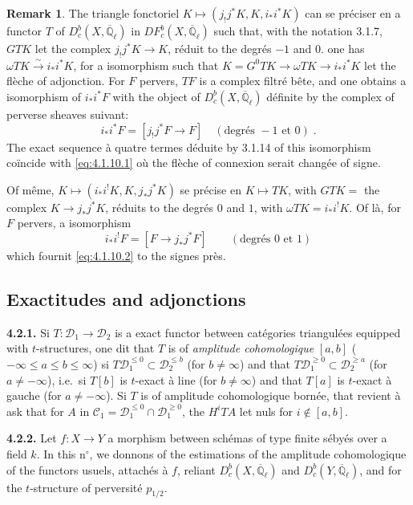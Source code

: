 \documentclass[12pt,a4paper]{article}
\theoremstyle{plain}
\theoremstyle{definition}
\newtheorem{remark}[theorem]{Remark}
\newcommand{\cC}{\mathcal{C}}
\newcommand{\cD}{\mathcal{D}}
\newcommand{\isom}{\xrightarrow{\sim}}
\providecommand{\cC}{\mathcal{C}}
\providecommand{\cD}{\mathcal{D}}
\begin{document}
\begin{remark}\label{rem:4.1.13}
The triangle fonctoriel $K \longmapsto (j_{!}j^{*}K, K, i_{*}i^{*}K)$ can se pr\'{e}ciser en a functor $T$ of $D_{c}^{b}(X,\overline{\mathbb{Q}}_{\ell})$ in $DF_{c}^{b}(X,\overline{\mathbb{Q}}_{\ell})$ such that, with the notation 3.1.7, $GTK$ let the complex $j_{!}j^{*}K \longrightarrow K$, r\'{e}duit to the degr\'{e}s $-1$ and $0$. one has $\omega TK \isom i_{*}i^{*}K$, for a isomorphism such that $K = G^{0}TK \to \omega TK \longrightarrow i_{*}i^{*}K$ let the fl\`{e}che of adjonction. For $F$ pervers, $TF$ is a complex filtr\'{e} b\^{e}te, and one obtains a isomorphism of $i_{*}i^{*}F$ with the object of $D_{c}^{b}(X,\overline{\mathbb{Q}}_{\ell})$ d\'{e}finite by the complex of perverse sheaves suivant:
\[
i_{*}i^{*}F = [j_{!}j^{*}F \longrightarrow F] \quad (\text{degr\'{e}s } -1 \text{ et } 0)\;.
\]
The exact sequence \`{a} quatre termes d\'{e}duite by 3.1.14 of this isomorphism co\"{i}ncide with \eqref{eq:4.1.10.1} o\`{u} the fl\`{e}che of connexion serait chang\'{e}e of signe.

Of m\^{e}me, $K \longmapsto (i_{*}i^{!}K, K, j_{*}j^{*}K)$ se pr\'{e}cise en $K \longmapsto TK$, with $GTK =$ the complex $K \to j_{*}j^{*}K$, r\'{e}duits to the degr\'{e}s $0$ and $1$, with $\omega TK = i_{*}i^{!}K$. Of l\`{a}, for $F$ pervers, a isomorphism
\[
i_{*}i^{!}F = [F \to j_{*}j^{*}F] \qquad (\text{degr\'{e}s } 0 \text{ et } 1)
\]
which fournit \eqref{eq:4.1.10.2} to the signes pr\`{e}s.
\end{remark}

\subsection{Exactitudes and adjonctions}

\noindent\textbf{4.2.1.} Si $T: \cD_{1} \to \cD_{2}$ is a exact functor between cat\'{e}gories triangul\'{e}es equipped with $t$-structures, one dit that $T$ is of \emph{amplitude cohomologique} $[a,b]$ ($-\infty \leq a \leq b \leq \infty$) si $T\cD_{1}^{\leq 0} \subset \cD_{2}^{\leq b}$ (for $b \neq \infty$) and that $T\cD_{1}^{\geq 0} \subset \cD_{2}^{\geq a}$ (for $a \neq -\infty$), i.e.\ si $T[b]$ is $t$-exact \`{a} line (for $b \neq \infty$) and that $T[a]$ is $t$-exact \`{a} gauche (for $a \neq -\infty$). Si $T$ is of amplitude cohomologique born\'{e}e, that revient \`{a} ask that for $A$ in $\cC_{1} = \cD_{1}^{\leq 0} \cap \cD_{1}^{\geq 0}$, the $H^{i}TA$ let nuls for $i \notin [a,b]$.

\noindent\textbf{4.2.2.} Let $f: X \longrightarrow Y$ a morphism between sch\'{e}mas of type finite s\'{e}by\'{e}s over a field $k$. In this n$^{\circ}$, we donnons of the estimations of the amplitude cohomologique of the functors usuels, attach\'{e}s \`{a} $f$, reliant $D_{c}^{b}(X,\overline{\mathbb{Q}}_{\ell})$ and $D_{c}^{b}(Y,\overline{\mathbb{Q}}_{\ell})$, and for the $t$-structure of perversit\'{e} $p_{1/2}$.
\end{document}
